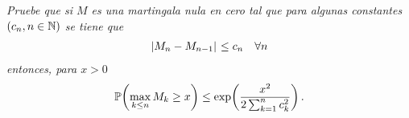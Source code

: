 \emph{
    Pruebe que si $M$ es una martingala nula en cero tal que para algunas constantes $\left( c_n,n\in\mathbb{N}\right) $ se tiene que
    \begin{align}
        \hspace{.25mm}\left|M_n-M_{n-1}\right|\hspace{.25mm}\leq c_n\quad\forall n
    \end{align}
    entonces, para $x>0$
    \begin{align}
        \mathbb{P}\! \left( \max_{k\leq n} M_k\geq x \right)\leq \exp\!\left( \frac{x^2}{2\sum_{k=1}^n c_k^2}\right) .
    \end{align}
}

\afterstatement\par\null